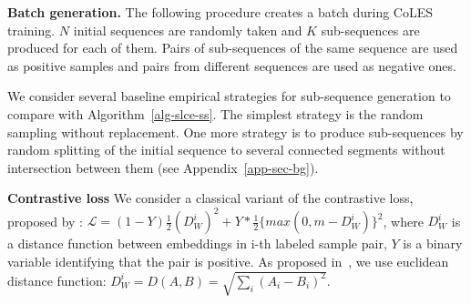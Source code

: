 \documentclass{article}
\begin{document}
\textbf{Batch generation.} The following procedure creates a batch during CoLES training. $N$ initial sequences are randomly taken and $K$ sub-sequences are produced for each of them. Pairs of sub-sequences of the same sequence are used as positive samples and pairs from different sequences are used as negative ones.

We consider several baseline empirical strategies for sub-sequence generation to compare with Algorithm~\ref{alg-slce-ss}. The simplest strategy is the random sampling without replacement.
One more strategy is to produce sub-sequences by random splitting of the initial sequence to several connected segments without intersection between them
(see Appendix~\ref{app-sec-bg}). %





\textbf{Contrastive loss} We consider a classical variant of the contrastive loss, proposed by \citep{Hadsell2006DimensionalityRB}: %
$ \mathcal{L} =  (1-Y)\frac{1}{2}(D_W^i)^2 +Y*\frac{1}{2}\{max(0,m-D_W^i)\}^2 $, where $D_W^i$ is a distance function between embeddings in i-th labeled sample pair, $Y$ is a binary variable identifying that the pair is positive.
As proposed in~\citep{Hadsell2006DimensionalityRB}, we use euclidean distance function: $D_W^i = D(A,B) = \sqrt{\sum_i(A_i - B_i)^2}$.
\end{document}
